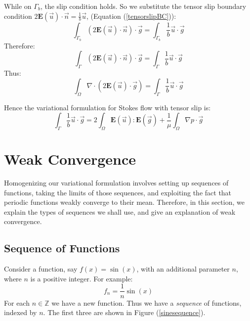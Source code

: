 \documentclass[12pt, a4paper, twoside, openright]{book}
\begin{document}
While on $\Gamma_b$, the slip condition holds.
So we substitute the tensor slip boundary condition $ 2 \mathbf{E}(\vec{u}) \cdot \vec{n} = \frac{1}{b} \vec{u}$, (Equation (\ref{tensorslipBC})):
\begin{equation}
\int_{\Gamma_b} ( 2 \mathbf{E}(\vec{u}) \cdot \vec{n} ) \cdot \vec{g} =
\int_{\Gamma_b} \frac{1}{b} \vec{u} \cdot \vec{g}
\end{equation}
Therefore:
\begin{equation}
\int_{\Gamma} ( 2 \mathbf{E}(\vec{u}) \cdot \vec{n} ) \cdot \vec{g} =
\int_{\Gamma} \frac{1}{b} \vec{u} \cdot \vec{g}
\end{equation}
Thus:
\begin{equation}
\int_{\Omega} \nabla \cdot ( 2 \mathbf{E}(\vec{u}) \cdot \vec{g} ) =
\int_{\Gamma} \frac{1}{b} \vec{u} \cdot \vec{g}
\end{equation}

\vspace*{1em}
Hence the variational formulation for Stokes flow with tensor slip is:
\begin{equation}
\int_{\Gamma} \frac{1}{b} \vec{u} \cdot \vec{g} = 
2 \int_{\Omega} \mathbf{E}(\vec{u}) : \mathbf{E}(\vec{g}) +
\frac{1}{\mu} \int_{\Omega}  \nabla p \cdot \vec{g}
\end{equation}


\section{Weak Convergence}

Homogenizing our variational formulation involves setting up sequences of functions, taking the limits of those sequences, and exploiting the fact that periodic functions weakly converge to their mean.  Therefore, in this section, we explain the types of sequences we shall use, and give an explanation of weak convergence.

\subsection{Sequence of Functions}

Consider a function, say $f(x) = \sin(x)$, with an additional parameter $n$, where $n$ is a positive integer.  For example:
\begin{equation}
f_n = \frac{1}{n} \sin (x)
\label{eq:sineseq}
\end{equation}
For each $n \in \mathbb{Z}$ we have a new function.  Thus we have a \emph{sequence} of functions, indexed by $n$.  The first three are shown in Figure (\ref{sinesequence}).
\end{document}
